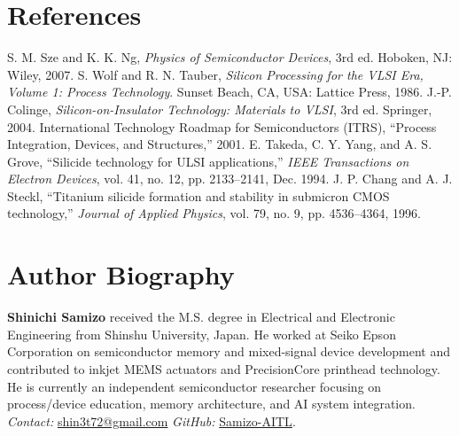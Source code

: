 \documentclass[conference]{IEEEtran}
\begin{document}
\section*{References}
\begin{thebibliography}{99}
 S. M. Sze and K. K. Ng, \textit{Physics of Semiconductor Devices}, 3rd ed. Hoboken, NJ: Wiley, 2007.
 S. Wolf and R. N. Tauber, \textit{Silicon Processing for the VLSI Era, Volume 1: Process Technology}. Sunset Beach, CA, USA: Lattice Press, 1986.
 J.-P. Colinge, \textit{Silicon-on-Insulator Technology: Materials to VLSI}, 3rd ed. Springer, 2004.
 International Technology Roadmap for Semiconductors (ITRS), ``Process Integration, Devices, and Structures,'' 2001.
 E. Takeda, C. Y. Yang, and A. S. Grove, ``Silicide technology for ULSI applications,'' \textit{IEEE Transactions on Electron Devices}, vol. 41, no. 12, pp. 2133--2141, Dec. 1994.
 J. P. Chang and A. J. Steckl, ``Titanium silicide formation and stability in submicron CMOS technology,'' \textit{Journal of Applied Physics}, vol. 79, no. 9, pp. 4536--4364, 1996.
\end{thebibliography}

\section*{Author Biography}
\textbf{Shinichi Samizo} received the M.S. degree in Electrical and Electronic Engineering from Shinshu University, Japan.  
He worked at Seiko Epson Corporation on semiconductor memory and mixed-signal device development and contributed to inkjet MEMS actuators and PrecisionCore printhead technology.  
He is currently an independent semiconductor researcher focusing on process/device education, memory architecture, and AI system integration.\\
\emph{Contact:} \href{mailto:shin3t72@gmail.com}{shin3t72@gmail.com}\quad
\emph{GitHub:} \href{https://github.com/Samizo-AITL}{Samizo-AITL}.
\end{document}
